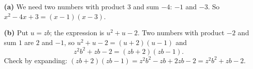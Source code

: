 \textbf{(a)} We need two numbers with product $3$ and sum $-4$: $-1$ and $-3$. So $x^2-4x+3=\boxed{(x-1)(x-3)}$.

\textbf{(b)} Put $u=zb$; the expression is $u^2+u-2$. Two numbers with product $-2$ and sum $1$ are $2$ and $-1$, so $u^2+u-2=(u+2)(u-1)$ and
\[
z^2b^2+zb-2=\boxed{(zb+2)(zb-1)}.
\]
Check by expanding: $(zb+2)(zb-1)=z^2b^2-zb+2zb-2=z^2b^2+zb-2$.
